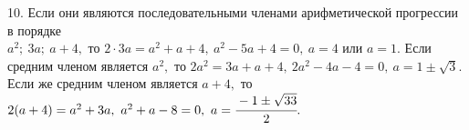 10. Если они являются последовательными членами арифметической прогрессии в порядке\\ $a^2;\ 3a;\ a+4,$ то $2\cdot3a=a^2+a+4,\ a^2-5a+4=0,\ a=4$ или $a=1.$ Если средним членом является $a^2,$ то $2a^2=3a+a+4,\ 2a^2-4a-4=0,\ a=1\pm\sqrt{3}.$ Если же средним членом является $a+4,$ то $2(a+4)=a^2+3a,\ a^2+a-8=0,\ a=\cfrac{-1\pm\sqrt{33}}{2}.$\\
